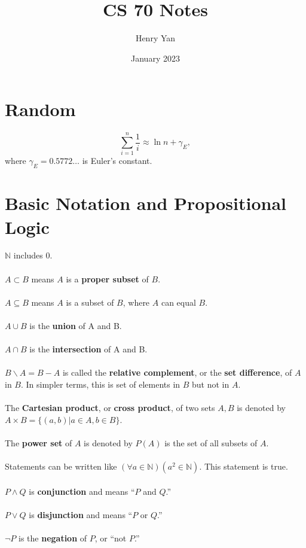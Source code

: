 \documentclass{article}
\title{CS 70 Notes}
\author{Henry Yan}
\date{January 2023}
\theoremstyle{definition}
\begin{document}
\maketitle

\section*{Random}
$$\sum_{i = 1}^n \frac{1}{i} \approx \ln{n} + \gamma_E,$$ where $\gamma_E = 0.5772 \dots$ is Euler’s constant.
\section*{Basic Notation and Propositional Logic}
$\mathbb{N}$ includes 0. \\ \\
$A \subset B$ means $A$ is a \textbf{proper subset} of $B$. \\ \\
$A \subseteq B$ means $A$ is a subset of $B$, where $A$ can equal $B$. \\ \\
$A \cup B$ is the \textbf{union} of A and B. \\ \\
$A \cap B$ is the \textbf{intersection} of A and B. \\ \\
$B \backslash A = B - A$ is called the \textbf{relative complement}, or the \textbf{set difference}, of $A$ in $B$. In simpler terms, this is set of elements in $B$ but not in $A$. \\ \\
The \textbf{Cartesian product}, or \textbf{cross product}, of two sets $A, B$ is denoted by $A \times B = \{(a, b) | a \in A, b \in B\}$. \\ \\
The \textbf{power set} of $A$ is denoted by $P(A)$ is the set of all subsets of $A$. \\ \\
Statements can be written like $(\forall a \in \mathbb{N})(a^2 \in \mathbb{N})$. This statement is true. \\ \\
$P \wedge Q$ is \textbf{conjunction} and means ``$P$ and $Q$.'' \\ \\
$P \vee Q$ is \textbf{disjunction} and means ``$P$ or $Q$.'' \\ \\
$\neg P$ is the \textbf{negation} of $P$, or ``not $P$.'' \\ \\
\end{document}

